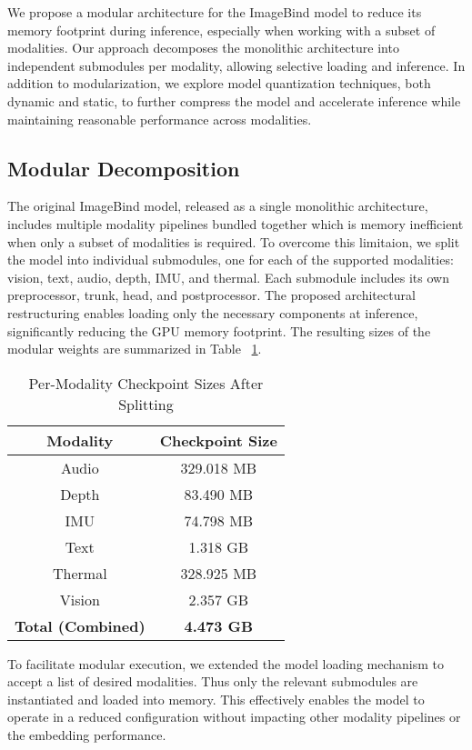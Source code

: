 \documentclass[runningheads]{IEEEtran}
\begin{document}
We propose a modular architecture for the ImageBind model to reduce its memory footprint during inference, especially when working with a subset of modalities. Our approach decomposes the monolithic architecture into independent submodules per modality, allowing selective loading and inference. In addition to modularization, we explore model quantization techniques, both dynamic and static, to further compress the model and accelerate inference while maintaining reasonable performance across modalities.

\subsection{Modular Decomposition}

The original ImageBind model, released as a single monolithic architecture, includes multiple modality pipelines bundled together which is memory inefficient when only a subset of modalities is required. To overcome this limitaion, we split the model into individual submodules, one for each of the supported modalities: vision, text, audio, depth, IMU, and thermal. Each submodule includes its own preprocessor, trunk, head, and postprocessor. The proposed architectural restructuring enables loading only the necessary components at inference, significantly reducing the GPU memory footprint. The resulting sizes of the modular weights are summarized in Table ~\ref{table:weights}.

\begin{table}[htbp]
\caption{Per-Modality Checkpoint Sizes After Splitting}
\begin{center}
\begin{tabular}{|c|c|}
\hline
\textbf{Modality} & \textbf{Checkpoint Size} \\
\hline
Audio & 329.018 MB \\
Depth & 83.490 MB \\
IMU & 74.798 MB \\
Text & 1.318 GB \\
Thermal & 328.925 MB \\
Vision & 2.357 GB \\
\hline
\textbf{Total (Combined)} & \textbf{4.473 GB} \\
\hline
\end{tabular}
\label{table:weights}
\end{center}
\end{table}

To facilitate modular execution, we extended the model loading mechanism to accept a list of desired modalities. Thus only the relevant submodules are instantiated and loaded into memory. This effectively enables the model to operate in a reduced configuration without impacting other modality pipelines or the embedding performance.
\end{document}
